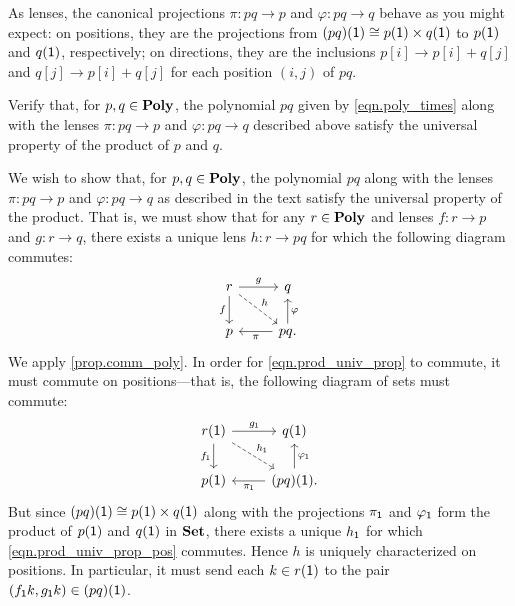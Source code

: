 \documentclass[Book-Poly]{subfiles}
\begin{document}
As lenses, the canonical projections $\pi \colon pq \to p$ and $\varphi \colon pq \to q$ behave as you might expect: on positions, they are the projections from $(pq)(\textsf{1}) \cong p(\textsf{1}) \times q(\textsf{1})$ to $p(\textsf{1})$ and $q(\textsf{1})$, respectively; on directions, they are the inclusions $p[i] \to p[i] + q[j]$ and $q[j] \to p[i] + q[j]$ for each position $(i, j)$ of $pq$.

\begin{exercise} \label{exc.poly_prod}
Verify that, for $p, q \in \mathbf{Poly}$, the polynomial $pq$ given by \eqref{eqn.poly_times} along with the lenses $\pi \colon pq \to p$ and $\varphi \colon pq \to q$ described above satisfy the universal property of the product of $p$ and $q$.
\begin{solution}
We wish to show that, for $p, q \in \mathbf{Poly}$, the polynomial $pq$ along with the lenses $\pi \colon pq \to p$ and $\varphi \colon pq \to q$ as described in the text satisfy the universal property of the product.
That is, we must show that for any $r \in \mathbf{Poly}$ and lenses $f \colon r \to p$ and $g \colon r \to q$, there exists a unique lens $h \colon r \to pq$ for which the following diagram commutes:
\begin{equation} \label{eqn.prod_univ_prop}
\begin{tikzcd}
	r \ar[d, "f"'] \ar[r, "g"] \ar[dr, "h", dashed] & q \\
	p & pq. \ar[l, "\pi"] \ar[u, "\varphi"']
\end{tikzcd}
\end{equation}
We apply \cref{prop.comm_poly}.
In order for \eqref{eqn.prod_univ_prop} to commute, it must commute on positions---that is, the following diagram of sets must commute:
\begin{equation} \label{eqn.prod_univ_prop_pos}
\begin{tikzcd}
	r(\1) \ar[d, "f_\1"'] \ar[r, "g_\1"] \ar[dr, "h_\1", dashed] & q(\1) \\
	p(\1) & (pq)(\1). \ar[l, "\pi_\1"] \ar[u, "\varphi_\1"']
\end{tikzcd}
\end{equation}
But since $(pq)(\textsf{1}) \cong p(1) \times q(\textsf{1})$ along with the projections $\pi_{\textsf{1}}$ and $\varphi_{\textsf{1}}$ form the product of $p(\textsf{1})$ and $q(\textsf{1})$ in $\mathbf{Set}$, there exists a unique $h_{\textsf{1}}$ for which \eqref{eqn.prod_univ_prop_pos} commutes.
Hence $h$ is uniquely characterized on positions.
In particular, it must send each $k \in r(\textsf{1})$ to the pair $(f_{\textsf{1}}k, g_{\textsf{1}}k) \in (pq)(\textsf{1})$.


\end{solution}
\end{exercise}
\end{document}
